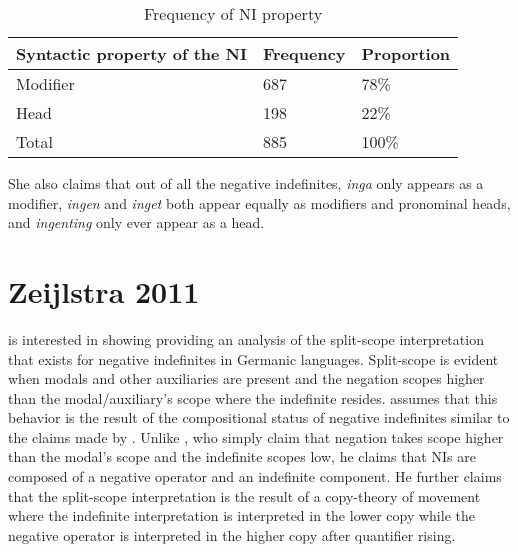 \documentclass[12pt, letterpaper]{article}
\begin{document}
	\begin{table}[!h]
	\centering
	\caption{Frequency of NI property}
	\begin{tabular}{lll}
	Syntactic property of the NI & Frequency & Proportion\\
	\hline
	Modifier & 687 & 78\% \\
	Head & 198 & 22\% \\
	\hline
	Total & 885 & 100\%  \\
	\hline
	\end{tabular}
	\end{table}

\ex She also claims that out of all the negative indefinites, \textit{inga} only appears as a modifier, \textit{ingen} and \textit{inget} both appear equally as modifiers and pronominal heads, and \textit{ingenting} only ever appear as a head. 
\z 

\section{Zeijlstra 2011} \label{sec:ZEIJLSTRA}

\ea \cite{zeijlstraSyntacticallyComplexStatus2011} is interested in showing providing an analysis of the split-scope interpretation that exists for negative indefinites in Germanic languages. 
\ex Split-scope is evident when modals and other auxiliaries are present and the negation scopes higher than the modal/auxiliary's scope where the indefinite resides. 
\ex \citeauthor{zeijlstraSyntacticallyComplexStatus2011} assumes that this behavior is the result of the compositional status of negative indefinites similar to the claims made by \citet{iatridouNegativeDPsAMovement2011}. Unlike \citeauthor{iatridouNegativeDPsAMovement2011}, who simply claim that negation takes scope higher than the modal's scope and the indefinite scopes low, he claims that NIs are composed of a negative operator and an indefinite component.
\ex He further claims that the split-scope interpretation is the result of a copy-theory of movement where the indefinite interpretation is interpreted in the lower copy while the negative operator is interpreted in the higher copy after quantifier rising. 
\z 

\end{document}
